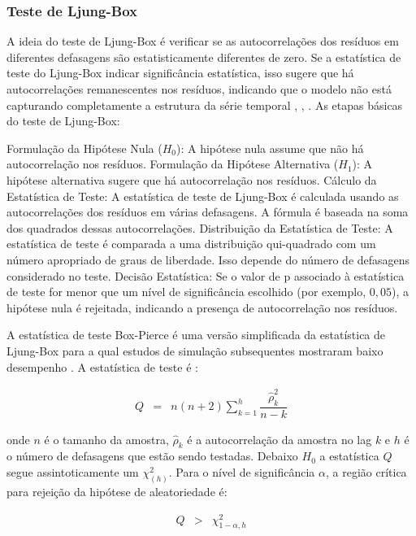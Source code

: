  \subsubsection{Teste de Ljung-Box}
 
A ideia do teste de Ljung-Box é verificar se as autocorrelações dos resíduos em diferentes defasagens são estatisticamente diferentes de zero. Se a estatística de teste do Ljung-Box indicar significância estatística, isso sugere que há autocorrelações remanescentes nos resíduos, indicando que o modelo não está capturando completamente a estrutura da série temporal \cite{box}, \cite{ljung}, \cite{dav}. As etapas básicas do teste de Ljung-Box:

Formulação da Hipótese Nula ($H_0$): A hipótese nula assume que não há autocorrelação nos resíduos.
Formulação da Hipótese Alternativa ($H_1$): A hipótese alternativa sugere que há autocorrelação nos resíduos.
Cálculo da Estatística de Teste: A estatística de teste de Ljung-Box é calculada usando as autocorrelações dos resíduos em várias defasagens. A fórmula é baseada na soma dos quadrados dessas autocorrelações.
Distribuição da Estatística de Teste: A estatística de teste é comparada a uma distribuição qui-quadrado com um número apropriado de graus de liberdade. Isso depende do número de defasagens considerado no teste.
Decisão Estatística: Se o valor de p associado à estatística de teste for menor que um nível de significância escolhido (por exemplo, $0,05$), a hipótese nula é rejeitada, indicando a presença de autocorrelação nos resíduos.
 
A estatística de teste Box-Pierce é uma versão simplificada da estatística de Ljung-Box para a qual estudos de simulação subsequentes mostraram baixo desempenho \cite{dav}. A estatística de teste é \cite{ljung}:
 
 \begin{eqnarray}
 	Q&=&n(n+2) \sum_{k=1}^h \dfrac{\hat{\rho}_k^2}{n-k}
 \end{eqnarray}
 
\noindent onde $n$ é o tamanho da amostra, $\hat{\rho}_k$ é a autocorrelação da amostra no lag $k$ e $h$ é o número de defasagens que estão sendo testadas. Debaixo $H_0$ a estatística $Q$ segue assintoticamente um $\chi_{(h)}^2$. Para o nível de significância $\alpha$, a região crítica para rejeição da hipótese de aleatoriedade é:
 
\begin{eqnarray}
 	Q&>&\chi_{1-\alpha, h}^2
\end{eqnarray}
 
